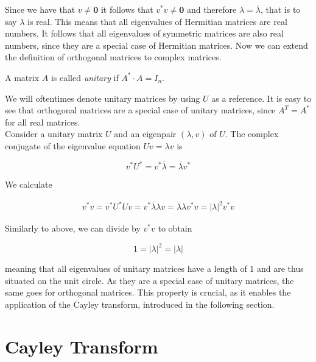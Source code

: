 Since we have that $v \neq \mathbf{0}$ it follows that $v^* v \neq \mathbf{0}$
and therefore $\lambda = \overline{\lambda}$, that is to say $\lambda$ is real.
This means that all eigenvalues of Hermitian matrices are real numbers.
It follows that all eigenvalues of symmetric matrices are also real numbers,
since they are a special case of Hermitian matrices.
Now we can extend the definition of orthogonal matrices to complex matrices.

\begin{definition}
    A matrix $A$ is called \emph{unitary} if $A^* \cdot A = I_n$.
\end{definition}

We will oftentimes denote unitary matrices by using $U$ as a reference.
It is easy to see that orthogonal matrices are a special case of unitary matrices,
since $A^T = A^*$ for all real matrices.\\
Consider a unitary matrix $U$ and an eigenpair $(\lambda, v)$ of $U$.
The complex conjugate of the eigenvalue equation $U v = \lambda v$ is

\begin{equation} \label{eq:eigenvalue_equation_complex_conjugate}
    v^* U^* = v^* \overline{\lambda} = \overline{\lambda} v^*
\end{equation}

We calculate

\begin{align*}
    v^* v = v^* U^* U v = v^* \overline{\lambda} \lambda v = \overline{\lambda} \lambda v^* v = \left| \lambda \right|^2 v^* v
\end{align*}

Similarly to above, we can divide by $v^* v$ to obtain

\begin{equation} \label{eq:unitary_eigenvalues}
    1 = \left| \lambda \right|^2 = \left| \lambda \right|
\end{equation}

meaning that all eigenvalues of unitary matrices have a length of $1$ and are thus situated on the unit circle.
As they are a special case of unitary matrices, the same goes for orthogonal matrices.
This property is crucial, as it enables the application of the Cayley transform,
introduced in the following section.

\section{Cayley Transform}

